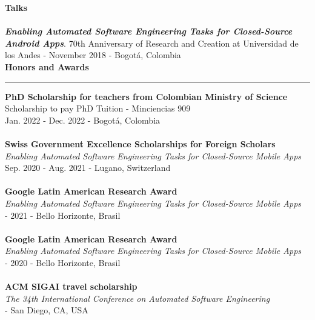 \documentclass[letterpaper,11pt,oneside]{article}
\begin{document}
\noindent \large{\textbf{Talks}} \\
\\
\indent \textit{\textbf{Enabling Automated Software Engineering Tasks for Closed-Source Android Apps}}. 70th Anniversary of Research and Creation at Universidad de los Andes - November 2018 - Bogot\'a, Colombia
\\ \newpage
\noindent \Large{\textbf{Honors and Awards}} \\
\vspace{-2ex}
\hrule 
\normalsize
\vspace{2ex}
\noindent \indent \textbf{PhD Scholarship for teachers from Colombian Ministry of Science } \\
\indent Scholarship to pay PhD Tuition  - Minciencias 909\\
\indent Jan. 2022 - Dec. 2022 - Bogot\'a, Colombia \\
\\
\noindent \indent \textbf{Swiss Government Excellence Scholarships for Foreign Scholars} \\
\indent \textit{Enabling Automated Software Engineering Tasks for Closed-Source Mobile Apps}\\
\indent Sep. 2020 - Aug. 2021 - Lugano, Switzerland \\
\\
\noindent \indent \textbf{Google Latin American Research Award} \\
\indent \textit{Enabling Automated Software Engineering Tasks for Closed-Source Mobile Apps}\\
 - 2021 - Bello Horizonte, Brasil \\
\\
\noindent \indent \textbf{Google Latin American Research Award} \\
\indent \textit{Enabling Automated Software Engineering Tasks for Closed-Source Mobile Apps}\\
 - 2020 - Bello Horizonte, Brasil \\
\\
\noindent \indent \textbf{ACM SIGAI travel scholarship} \\
\indent \textit{The 34th International Conference on Automated Software Engineering }\\
 - San Diego, CA, USA \\
\end{document}
